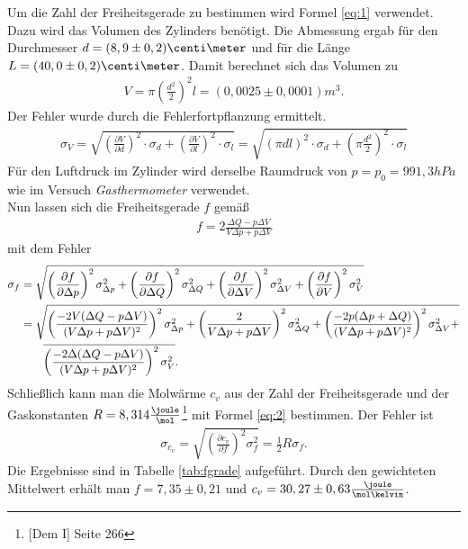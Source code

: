 \documentclass[12pt, a4paper, twoside]{scrartcl}
\begin{document}
Um die Zahl der Freiheitsgerade zu bestimmen wird Formel \ref{eq:1} verwendet. Dazu wird das Volumen des Zylinders benötigt. Die Abmessung ergab für den Durchmesser $d=(8,9\pm0,2)\centi\meter$ und für die Länge $L=(40,0\pm0,2)\centi\meter$. Damit berechnet sich das Volumen zu \begin{align*}V=\pi \left(\frac{d^2}{2}\right)^2l=(0,0025\pm0,0001)m^3.\end{align*} Der Fehler wurde durch die Fehlerfortpflanzung ermittelt.
\begin{align*}
\sigma_V=\sqrt{\left(\frac{\partial V}{\partial d}\right)^2\cdot\sigma_d+\left(\frac{\partial V}{\partial l}\right)^2\cdot\sigma_l}=\sqrt{\left(\pi dl\right)^2\cdot\sigma_d+\left(\pi \frac{d^2}{2}\right)^2\cdot\sigma_l}
\end{align*}
Für den Luftdruck im Zylinder wird derselbe Raumdruck von $p=p_0=991,3hPa$ wie im Versuch \textit{Gasthermometer} verwendet.\\
Nun lassen sich die Freiheitsgerade $f$ gemäß
\begin{align*}
f=2\frac{\Delta Q-p\Delta V}{V\Delta p+p\Delta V}
\end{align*}
mit dem Fehler
\begin{align*}
\sigma_f&=\sqrt{\left(\frac{\partial f}{\partial \Delta p}\right)^2\sigma_{\Delta p}^2+\left(\frac{\partial f}{\partial \Delta Q}\right)^2\sigma_{\Delta Q}^2+\left(\frac{\partial f}{\partial \Delta V}\right)^2\sigma_{\Delta V}^2+\left(\frac{\partial f}{\partial V}\right)^2\sigma_{V}^2}\\
 &=\sqrt{\left(\frac{-2V(\Delta Q-p\Delta V)}{(V\Delta p+p\Delta V)^2}\right)^2\sigma_{\Delta p}^2+\left(\frac{2}{V\Delta p+p\Delta V}\right)^2\sigma_{\Delta Q}^2+\left(\frac{-2p(\Delta p+\Delta Q)}{(V\Delta p+p\Delta V)^2}\right)^2\sigma_{\Delta V}^2+}\\
 &\hspace{0.7cm}\overline{\left(\frac{-2\Delta(\Delta Q-p\Delta V)}{(V\Delta p+p\Delta V)^2}\right)^2\sigma_V^2}.
\end{align*}
Schließlich kann man die Molwärme $c_v$ aus der Zahl der Freiheitsgerade und der Gaskonstanten $R=8,314\frac{\joule}{\mol}$\footnote{[Dem I] Seite 266} mit Formel \ref{eq:2} bestimmen. Der Fehler ist
\begin{align*}
\sigma_{c_v}=\sqrt{\left(\frac{\partial c_v}{\partial f}\right)^2\sigma_f^2}=\frac{1}{2}R\sigma_f.
\end{align*}
Die Ergebnisse sind in Tabelle \ref{tab:fgrade} aufgeführt. Durch den gewichteten Mittelwert erhält man $f=7,35\pm0,21$ und $c_v=30,27\pm0,63\frac{\joule}{\mol\kelvin}$.
\end{document}
